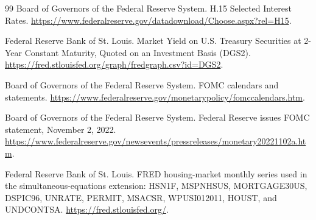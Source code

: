 \documentclass[UTF8,zihao=-4]{ctexart}
\begin{document}
\begin{thebibliography}{99}
Board of Governors of the Federal Reserve System.
\newblock H.15 Selected Interest Rates.
\newblock \url{https://www.federalreserve.gov/datadownload/Choose.aspx?rel=H15}.

Federal Reserve Bank of St. Louis.
\newblock Market Yield on U.S. Treasury Securities at 2-Year Constant Maturity, Quoted on an Investment Basis (DGS2).
\newblock \url{https://fred.stlouisfed.org/graph/fredgraph.csv?id=DGS2}.

Board of Governors of the Federal Reserve System.
\newblock FOMC calendars and statements.
\newblock \url{https://www.federalreserve.gov/monetarypolicy/fomccalendars.htm}.

Board of Governors of the Federal Reserve System.
\newblock Federal Reserve issues FOMC statement, November 2, 2022.
\newblock \url{https://www.federalreserve.gov/newsevents/pressreleases/monetary20221102a.htm}.

Federal Reserve Bank of St. Louis.
\newblock FRED housing-market monthly series used in the simultaneous-equations extension: HSN1F, MSPNHSUS, MORTGAGE30US, DSPIC96, UNRATE, PERMIT, MSACSR, WPUSI012011, HOUST, and UNDCONTSA.
\newblock \url{https://fred.stlouisfed.org/}.

\end{thebibliography}
\end{document}
